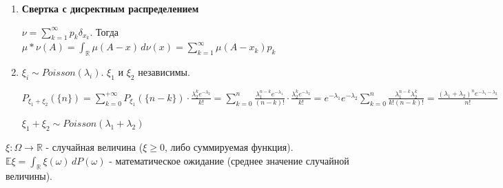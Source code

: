 \begin{example}
    \begin{enumerate}
        \item {
            \textbf{Свертка с дисректным распределением}

            $\nu = \sum_{k = 1}^{\infty} p_k \delta_{x_k}$. Тогда $\mu * \nu (A) = \int_{\mathbb{R}} \mu (A - x) \, d\nu (x) =
            \sum_{k = 1}^{\infty} \mu (A - x_k) p_k$
        }
        \item {
            $\xi_i \sim Poisson(\lambda_i)$. $\xi_1$ и $\xi_2$ независимы.

            $P_{\xi_1 + \xi_2} (\{ n \}) = \sum_{k = 0}^{+\infty} P_{\xi_1} (\{ n  - k \}) \cdot
            \frac{\lambda_2^k e^{-\lambda_2}}{k!} = \sum_{k = 0}^{n} \frac{\lambda_1^{n - k} e^{-\lambda_1}}{(n - k)!} \cdot
            \frac{\lambda_2^k e^{-\lambda_2}}{k!} = e^{-\lambda_1} e^{-\lambda_2} \sum_{k = 0}^n \frac{\lambda_1^{n - k} \lambda_2^k}{k! (n - k)!} =
            \frac{(\lambda_1 + \lambda_2)^n e^{-\lambda_1 - \lambda_2}}{n!}$

            $\xi_1 + \xi_2 \sim Poisson(\lambda_1 + \lambda_2)$
        }
    \end{enumerate}
\end{example}




\begin{definition}
    $\xi : \Omega \rightarrow \mathbb{R}$ - случайная величина ($\xi \geq 0 $, либо суммируемая функция). $\mathbb{E} \xi = \int_{\mathbb{R}} \xi (\omega) \, dP(\omega)$ - математическое ожидание (среднее значение случайной величины).
\end{definition}

